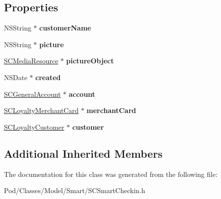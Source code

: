 \subsection*{Properties}
\begin{DoxyCompactItemize}
\item 
N\+S\+String $\ast$ {\bfseries customer\+Name}\hypertarget{interface_s_c_smart_checkin_a96008b8ff1569f80983852a769f2c17b}{}\label{interface_s_c_smart_checkin_a96008b8ff1569f80983852a769f2c17b}

\item 
N\+S\+String $\ast$ {\bfseries picture}\hypertarget{interface_s_c_smart_checkin_a39adc187328cd9627900a77871d9119d}{}\label{interface_s_c_smart_checkin_a39adc187328cd9627900a77871d9119d}

\item 
\hyperlink{interface_s_c_media_resource}{S\+C\+Media\+Resource} $\ast$ {\bfseries picture\+Object}\hypertarget{interface_s_c_smart_checkin_a73521d1c5ce9e8dea856ecfaf282bf34}{}\label{interface_s_c_smart_checkin_a73521d1c5ce9e8dea856ecfaf282bf34}

\item 
N\+S\+Date $\ast$ {\bfseries created}\hypertarget{interface_s_c_smart_checkin_a0b39c718cad7a202f859aaf198b56c9d}{}\label{interface_s_c_smart_checkin_a0b39c718cad7a202f859aaf198b56c9d}

\item 
\hyperlink{interface_s_c_general_account}{S\+C\+General\+Account} $\ast$ {\bfseries account}\hypertarget{interface_s_c_smart_checkin_a048855279dc96643af962930fe9d15ab}{}\label{interface_s_c_smart_checkin_a048855279dc96643af962930fe9d15ab}

\item 
\hyperlink{interface_s_c_loyalty_merchant_card}{S\+C\+Loyalty\+Merchant\+Card} $\ast$ {\bfseries merchant\+Card}\hypertarget{interface_s_c_smart_checkin_a00eb7a1693cb0660700b5716f0c9f195}{}\label{interface_s_c_smart_checkin_a00eb7a1693cb0660700b5716f0c9f195}

\item 
\hyperlink{interface_s_c_loyalty_customer}{S\+C\+Loyalty\+Customer} $\ast$ {\bfseries customer}\hypertarget{interface_s_c_smart_checkin_a4e2e5c09529f2b6d46205ca5c571ca51}{}\label{interface_s_c_smart_checkin_a4e2e5c09529f2b6d46205ca5c571ca51}

\end{DoxyCompactItemize}
\subsection*{Additional Inherited Members}


The documentation for this class was generated from the following file\+:\begin{DoxyCompactItemize}
\item 
Pod/\+Classes/\+Model/\+Smart/S\+C\+Smart\+Checkin.\+h\end{DoxyCompactItemize}
